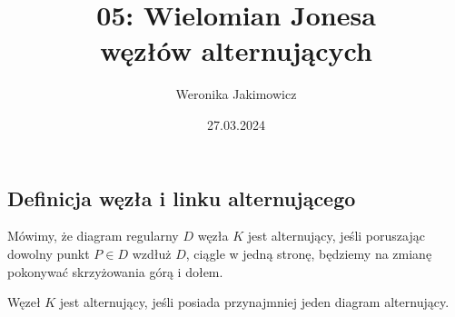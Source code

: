 \documentclass{article}
\title{05: Wielomian Jonesa\\ węzłów alternujących}
\author{Weronika Jakimowicz}
\date{27.03.2024}
\begin{document}
\maketitle
\thispagestyle{empty}

\def\dupa{\textwidth - 4cm}


\tableofcontents\setcounter{page}{0}
\newpage 
\pagestyle{plain}

\subsection{Definicja węzła i linku alternującego}

Mówimy, że diagram regularny $D$ węzła $K$ jest alternujący, jeśli poruszając dowolny punkt $P\in D$ wzdłuż $D$, ciągle w jedną stronę, będziemy na zmianę pokonywać skrzyżowania górą i dołem.

\begin{deff}
  Węzeł $K$ jest alternujący, jeśli posiada przynajmniej jeden diagram alternujący.
\end{deff}
\end{document}

